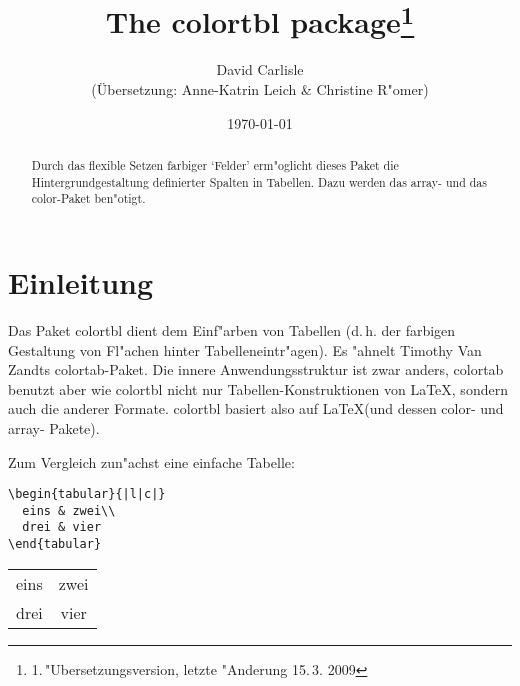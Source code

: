 \documentclass[ngerman]{article}
\begin{document}
\def\slash#1{\textbackslash#1}

 \title{The \textsf{colortbl} package\footnote{1.\,"Ubersetzungsversion,
 letzte "Anderung 15.\,3. 2009}}

 \author{{\huge David Carlisle}\\ (\"Ubersetzung: Anne-Katrin Leich \& Christine
 R"omer)}

\date{\today}

\maketitle

\begin{abstract}
Durch das flexible Setzen farbiger `Felder' erm"oglicht dieses Paket die 
Hintergrundgestaltung definierter Spalten in Tabellen. Dazu werden das \textsf{array}- und 
das \textsf{color}-Paket ben"otigt.
\end{abstract}

\section{Einleitung}

Das Paket \textsf{colortbl} dient dem Einf"arben von Tabellen (d.\,h. der farbigen 
Gestaltung von 
Fl"achen hinter Tabelleneintr"agen). Es "ahnelt Timothy Van Zandts \textsf{colortab}-Paket. 
Die innere Anwendungsstruktur ist zwar anders, \textsf{colortab} benutzt aber wie 
\textsf{colortbl} nicht nur Tabellen-Konstruktionen von \LaTeX, sondern auch die anderer 
Formate. \textsf{colortbl} basiert also auf \LaTeX (und dessen \textsf{color}- und 
\textsf{array}- Pakete).

	Zum Vergleich zun"achst eine einfache Tabelle:

\begin{center}
\begin{minipage}{.75\textwidth}
\begin{verbatim}
\begin{tabular}{|l|c|}
  eins & zwei\\
  drei & vier
\end{tabular}
\end{verbatim}
\end{minipage}
{\bfseries
  \begin{tabular}{|l|c|}
  eins&zwei\\
  drei&vier
  \end{tabular}}
 \end{center}
\end{document}

